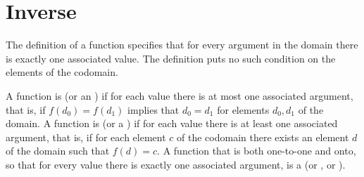 \documentclass{ibl}  %
\begin{document}
\section{Inverse}

The definition of a function specifies that for every argument in the
domain there is 
exactly one associated value.
The definition puts no such condition on the elements of the codomain.

\begin{df}
A function is  (or an ) 
if for each value there is at most
one associated argument, that is, if $f(d_0)=f(d_1)$ implies that $d_0=d_1$
for elements $d_0,d_1$ of the domain.
A function is  (or a ) 
if for each value there is at least
one associated argument, that is, if for each element $c$ of the codomain
there exists an element $d$ of the domain such that $f(d)=c$.
A function that is both one-to-one and onto, so that for every value there
is exactly one associated argument, is a 
 (or , or ).
\end{df}
\end{document}
